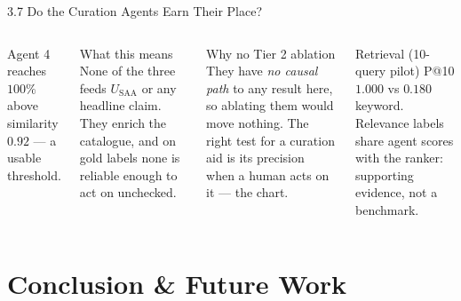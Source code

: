 \documentclass[aspectratio=169,11pt]{beamer}
\begin{document}
\begin{frame}{3.7 Do the Curation Agents Earn Their Place?}
\scriptsize
\begin{columns}[T]
\centering
{}
\vskip 1pt
{\tiny Agent 4 reaches $100\%$ above similarity $0.92$ --- a usable threshold.}

\begin{block}{\scriptsize What this means}
\tiny None of the three feeds $U_{\text{SAA}}$ or any headline claim. They enrich the catalogue, and on gold labels none is reliable enough to act on unchecked.
\end{block}
\vspace{-2mm}
\begin{block}{\scriptsize Why no Tier 2 ablation}
\tiny They have \emph{no causal path} to any result here, so ablating them would move nothing. The right test for a curation aid is its precision when a human acts on it --- the chart.
\end{block}
\vspace{-2mm}
\begin{alertblock}{\scriptsize Retrieval (10-query pilot)}
\tiny P@10 $1.000$ vs $0.180$ keyword. Relevance labels share agent scores with the ranker: supporting evidence, not a benchmark.
\end{alertblock}
\end{columns}
\end{frame}

\section{Conclusion \& Future Work}
\end{document}
